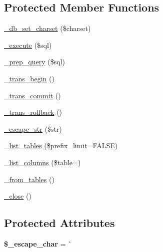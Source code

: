 \subsection*{Protected Member Functions}
\begin{DoxyCompactItemize}
\item 
\mbox{\hyperlink{class_c_i___d_b__mysql__driver_abd6cef05e70b1425730c251085c06362}{\+\_\+db\+\_\+set\+\_\+charset}} (\$charset)
\item 
\mbox{\hyperlink{class_c_i___d_b__mysql__driver_a64efb05060909830650a33b2b5dab6f9}{\+\_\+execute}} (\$sql)
\item 
\mbox{\hyperlink{class_c_i___d_b__mysql__driver_a237e54c34a0a94287a04f23e1fc6e0ed}{\+\_\+prep\+\_\+query}} (\$sql)
\item 
\mbox{\hyperlink{class_c_i___d_b__mysql__driver_a3905da822b6ffc78ce6aaabb52997c4e}{\+\_\+trans\+\_\+begin}} ()
\item 
\mbox{\hyperlink{class_c_i___d_b__mysql__driver_adf10b18f7bd691fb6219f6e9cc765472}{\+\_\+trans\+\_\+commit}} ()
\item 
\mbox{\hyperlink{class_c_i___d_b__mysql__driver_a019e04eaf3cfbef17863a83b5241bc4a}{\+\_\+trans\+\_\+rollback}} ()
\item 
\mbox{\hyperlink{class_c_i___d_b__mysql__driver_ac60e4c46b1c2ce00f8461b3c2c0be2b5}{\+\_\+escape\+\_\+str}} (\$str)
\item 
\mbox{\hyperlink{class_c_i___d_b__mysql__driver_affa96317ec0ee6f0123e4f347d9c73f7}{\+\_\+list\+\_\+tables}} (\$prefix\+\_\+limit=F\+A\+L\+SE)
\item 
\mbox{\hyperlink{class_c_i___d_b__mysql__driver_a71010e2a4cae5f018c1cbaa20a1878d3}{\+\_\+list\+\_\+columns}} (\$table=\textquotesingle{}\textquotesingle{})
\item 
\mbox{\hyperlink{class_c_i___d_b__mysql__driver_a7fa75cf58a8cfa276e3bf396eea369d8}{\+\_\+from\+\_\+tables}} ()
\item 
\mbox{\hyperlink{class_c_i___d_b__mysql__driver_a392bb4dd401caa562a49bfcc1e13028b}{\+\_\+close}} ()
\end{DoxyCompactItemize}
\subsection*{Protected Attributes}
\begin{DoxyCompactItemize}
\item 
\mbox{\label{class_c_i___d_b__mysql__driver_aaf108aaa16adf0cd24ff4477f73dec09}} 
{\bfseries \$\+\_\+escape\+\_\+char} = \textquotesingle{}\`{}\textquotesingle{}
\end{DoxyCompactItemize}


